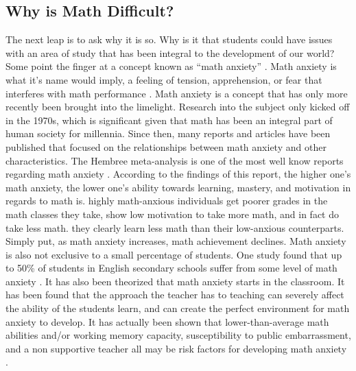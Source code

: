\subsection{Why is Math Difficult?} 
\label{sub:why_is_math_difficult}
The next leap is to ask why it is so. Why is it that students could have issues with an area of study that has been integral to the development of our world? Some point the finger at a concept known as \enquote{math anxiety} \cite{BeilockSianMathIt}. Math anxiety is what it's name would imply, a feeling of tension, apprehension, or fear that interferes with math performance \cite{Ashcraft2002MathConsequences}.
\newline\newline
Math anxiety is a concept that has only more recently been brought into the limelight. Research into the subject only kicked off in the 1970s, which is significant given that math has been an integral part of human society for millennia. Since then, many reports and articles have been published that focused on the relationships between math anxiety and other characteristics. 
\newline\newline
The Hembree meta-analysis is one of the most well know reports regarding math anxiety \cite{Hembree1990THEANXIETY}. According to the findings of this report, the higher one’s math anxiety, the lower one’s ability  towards learning, mastery, and motivation in regards to math is. highly math-anxious individuals get poorer grades in the math classes they take, show low motivation to take more math, and in fact do take less math. they clearly learn less math than their low-anxious counterparts. Simply put, as math anxiety increases, math achievement declines. Math anxiety is also not exclusive to a small percentage of students. One study found that up to 50\% of students in English secondary schools suffer from some level of math anxiety \cite{NormanMathsStudents}.  
\newline\newline
It has also been theorized that math anxiety starts in the classroom. It has been found that the approach the teacher has to teaching can severely affect the ability of the students learn, and can create the perfect environment for math anxiety to develop. It has actually been shown that  lower-than-average math abilities and/or working memory capacity, susceptibility to public embarrassment, and a non supportive teacher all may be risk factors for developing math anxiety \cite{Ashcraft2002MathConsequences}.

